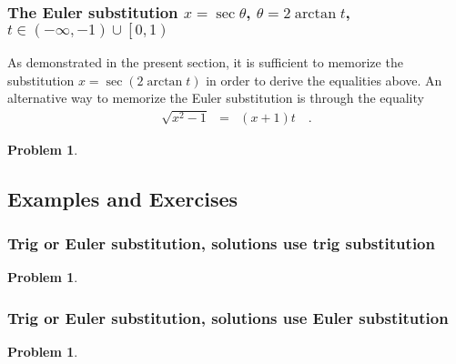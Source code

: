 \documentclass[12pt]{book}
\newtheorem{problem}[theorem]{Problem}
\begin{document}


\subsubsection{The Euler substitution $x=\sec \theta$, $\theta = 2\arctan t$, $ t\in (-\infty, -1) \cup \left[0, 1 \right) $}




As demonstrated in the present section, it is sufficient to memorize the substitution $x=\sec (2\arctan t)$ in order to derive the equalities above. An alternative way to memorize the Euler substitution is through the equality
\[
\begin{array}{rcl}
\sqrt{x^2-1}&=&(x+1)t\quad .
\end{array}
\]
\begin{problem}

\end{problem}




\subsection{Examples and Exercises}
\subsubsection{Trig or Euler substitution, solutions use trig substitution}

\begin{problem}

\end{problem}


\subsubsection{Trig or Euler substitution, solutions use Euler substitution}
\begin{problem}

\end{problem}

\end{document}
